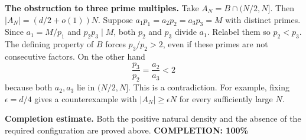 \textbf{The obstruction to three prime multiples.}
Take $A_N=B\cap(N/2,N]$. Then $|A_N|=(d/2+o(1))N$. Suppose
$a_1p_1=a_2p_2=a_3p_3=M$ with distinct primes. Since $a_1=M/p_1$ and $p_2p_3\mid M$, both $p_2$ and $p_3$ divide $a_1$. Relabel them so $p_2<p_3$. The defining property of $B$ forces $p_3/p_2>2$, even if these primes are not consecutive factors. On the other hand
\[
 \frac{p_3}{p_2}=\frac{a_2}{a_3}<2
\]
because both $a_2,a_3$ lie in $(N/2,N]$. This is a contradiction.
For example, fixing $\epsilon=d/4$ gives a counterexample with $|A_N|\geq\epsilon N$ for every sufficiently large $N$.

\textbf{Completion estimate.}
Both the positive natural density and the absence of the required configuration are proved above.
\textbf{COMPLETION: 100\%}
